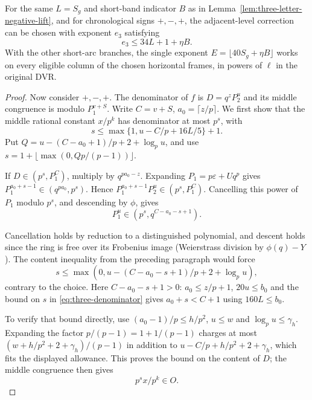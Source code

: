 \begin{lemma}\label{lem:three-letter-positive-lift}
For the same \(L=S_g\) and short-band indicator \(B\) as in
Lemma~\ref{lem:three-letter-negative-lift}, and for chronological signs \(+,-,+\), the adjacent-level correction can be chosen with exponent \(e_3\) satisfying
\[
 e_3\le34L+1+\eta B.
\] With the other short-arc branches, the
single exponent \(E=\lfloor40S_g+\eta B\rfloor\) works on
every eligible column of the chosen horizontal frames,
in powers of \(\ell\) in the original DVR.
\end{lemma}

\begin{proof}
Now consider \(+,-,+\). The denominator of \(f\) is
\(D=q^zP_2^u\) and its middle congruence is modulo
\(P_1^{v+S}\). Write \(C=v+S\), \(a_0=\lceil z/p\rceil\).
We first show that the middle rational constant \(x/p^k\)
has denominator at most \(p^s\), with
\begin{equation}\label{eq:three-denominator}
 s\le\max\{1,u-C/p+16L/5\}+1 .
\end{equation}
Put \(Q=u-(C-a_0+1)/p+2+\log_p u\), and use
\(s=1+\lfloor\max(0,Qp/(p-1))\rfloor\).

If \(D\in(p^s,P_1^C)\), multiply by \(q^{pa_0-z}\).
Expanding \(P_1=p\varepsilon+Uq^p\) gives
\(P_1^{a_0+s-1}\in(q^{pa_0},p^s)\).
Hence \(P_1^{a_0+s-1}P_2^u\in(p^s,P_1^C)\).
Cancelling this power of \(P_1\) modulo \(p^s\), and descending
by \(\phi\), gives
\[
 P_1^u\in(p^s,q^{C-a_0-s+1}).
\]

Cancellation holds by reduction to a distinguished polynomial,
and descent holds since the ring is free over its Frobenius
image (Weierstrass division by \(\phi(q)-Y\)).
The content inequality from the preceding paragraph would force
\[
 s\le\max(0,u-(C-a_0-s+1)/p+2+\log_p u),
\]
contrary to the choice. Here \(C-a_0-s+1>0\):
\(a_0\le z/p+1\), \(20u\le b_0\) and the bound on \(s\)
in \eqref{eq:three-denominator} gives \(a_0+s<C+1\) using
\(160L\le b_0\).

To verify that bound directly, use
\((a_0-1)/p\le h/p^2\), \(u\le w\) and \(\log_p u\le\gamma_h\).
Expanding the factor \(p/(p-1)=1+1/(p-1)\) charges at most
\((w+h/p^2+2+\gamma_h)/(p-1)\) in addition to
\(u-C/p+h/p^2+2+\gamma_h\), which fits the displayed allowance.
This proves the bound on the content of \(D\); the middle
congruence then gives
\[
 p^sx/p^k\in O.
\]



\end{proof}

